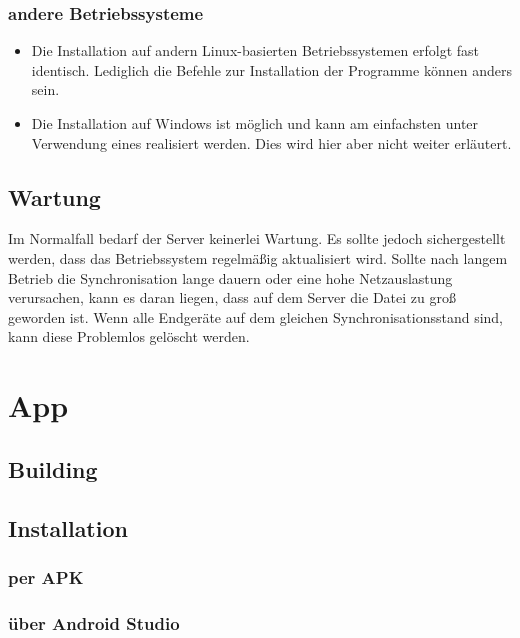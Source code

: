 \documentclass{article}
\begin{document}
\subsubsection{andere Betriebssysteme}
\begin{itemize}
    \item Die Installation auf andern Linux-basierten Betriebssystemen erfolgt
        fast identisch. Lediglich die Befehle zur Installation
        der Programme können anders sein.
    \item Die Installation auf Windows ist möglich und kann am einfachsten 
        unter Verwendung eines  realisiert werden. Dies 
        wird hier aber nicht weiter erläutert.
\end{itemize}
\subsection{Wartung}
Im Normalfall bedarf der Server keinerlei Wartung. 
Es sollte jedoch sichergestellt werden, dass das Betriebssystem regelmäßig aktualisiert
wird. Sollte nach langem Betrieb die Synchronisation lange dauern oder eine 
hohe Netzauslastung verursachen, kann es daran liegen, dass auf dem Server
die Datei  zu groß geworden ist. Wenn alle Endgeräte auf dem 
gleichen Synchronisationsstand sind, kann diese Problemlos gelöscht werden.
\section{App}
\subsection{Building}
\subsection{Installation}
\subsubsection{per APK}
\subsubsection{über Android Studio}
\end{document}
